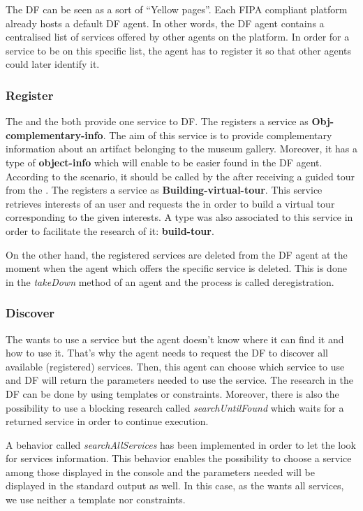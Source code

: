 \documentclass[a4paper,11pt]{article}
\begin{document}
  The DF can be seen as a sort of ``Yellow pages''. Each FIPA compliant platform already hosts a default DF agent. In other words, the DF agent
  contains a centralised list of services offered by other agents on the platform. In order for a service to be on this specific list, 
  the agent has to register it so that other agents could later identify it.
  
  \subsubsection{Register} %
  The \cu{} and the \to{} both provide one service to DF. The \cu{} registers a service as \textbf{Obj-complementary-info}.
  The aim of this service is to provide complementary information about an artifact belonging to the museum gallery. Moreover, it has a type
  of \textbf{object-info} which will enable to be easier found in the DF agent. According to the scenario, it should be called 
  by the \pa{} after receiving a guided tour from the \to{}. The \to{} registers a service as \textbf{Building-virtual-tour}. 
  This service retrieves interests of an user and requests the \cu{} in order to build a virtual tour corresponding to the given interests.
  A type was also associated to this service in order to facilitate the research of it: \textbf{build-tour}.
  
  On the other hand, the registered services are deleted from the DF agent at the moment when the agent which offers the specific service is deleted.
  This is done in the \textit{takeDown} method of an agent and the process is called deregistration.
  
  \subsubsection{Discover} %
  The \pa{} wants to use a service but the agent doesn't know where it can find it and how to use it. That's why the agent needs 
  to request the DF to discover all available (registered) services. Then, this agent can choose which service to use and DF will 
  return the parameters needed to use the service. The research in the DF can be done by using templates or constraints. Moreover,
  there is also the possibility to use a blocking research called \textit{searchUntilFound} which waits for a returned service in order to continue execution.
  
  A behavior called \textit{searchAllServices} has been implemented in order to let the \pa{} look for services information. This behavior
  enables the possibility to choose a service among those displayed in the console and the parameters needed will be displayed in the standard output as well.
  In this case, as the \pa{} wants all services, we use neither a template nor constraints.
  
\end{document}
